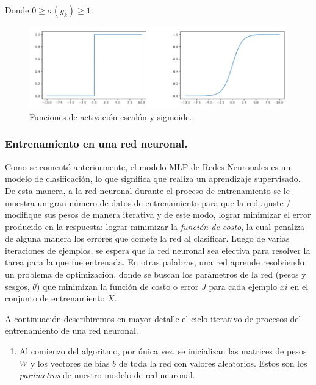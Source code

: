 \documentclass[12pt,a4paper]{article}
\begin{document}
\begin{sloppypar}
Donde $0 \geq \sigma(y_k) \geq 1$.    

\begin{figure}[H]    %
 \centering
 \includegraphics[width=1\textwidth]{images/ANN/5-ANN.png}
 \caption{Funciones de activación escalón y sigmoide\cite{ANN_25}.} 
 \label{fig:ann_5}
\end{figure}

\subsubsection{Entrenamiento en una red neuronal.}

Como se comentó anteriormente, el modelo MLP de Redes Neuronales es un modelo de clasificación, lo que significa que realiza un aprendizaje supervisado. De esta manera, a la red neuronal durante el proceso de entrenamiento se le muestra un gran número de datos de entrenamiento para que la red ajuste / modifique sus pesos de manera iterativa y de este modo, lograr minimizar el error producido en la respuesta: lograr minimizar la \textit{función de costo}, la cual penaliza de alguna manera los errores que comete la red al clasificar. Luego de varias iteraciones de ejemplos, se espera que la red neuronal sea efectiva para resolver la tarea para la que fue entrenada.
En otras palabras, una red aprende resolviendo un problema de optimización, donde se buscan los parámetros de la red (pesos y sesgos, $\theta$) que minimizan la función de costo o error $J$ para cada ejemplo $xi$ en el conjunto de entrenamiento $X$. 

A continuación describiremos en mayor detalle el ciclo iterativo de procesos del entrenamiento de una red neuronal\cite{ANN_25}.

\begin{enumerate}
\item Al comienzo del algoritmo, por única vez, se inicializan las matrices de pesos $W$ y los vectores de bias $b$ de toda la red con valores aleatorios. Estos son los \textit{parámetros} de nuestro modelo de red neuronal.
  

\end{enumerate}
\end{sloppypar}
\end{document}
